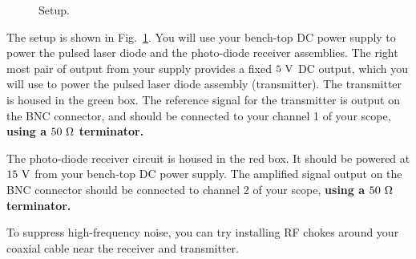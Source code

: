 \begin{figure}[htbp]
\begin{center}
\end{center}
\caption{\label{fig:csetup} Setup.}
\end{figure}

The setup is shown in Fig.~\ref{fig:csetup}.  You will use your
bench-top DC power supply to power the pulsed laser diode and the
photo-diode receiver assemblies.  The right most pair of output from
your supply provides a fixed $5~\rm V$ DC output, which you will use
to power the pulsed laser diode assembly (transmitter).  The
transmitter is housed in the green box. The reference signal for the
transmitter is output on the BNC connector, and should be connected to
your channel 1 of your scope, {\bf using a $50~\rm \Omega$ terminator.}

The photo-diode receiver circuit is housed in the red box.  It should
be powered at $15~\rm V$ from your bench-top DC power supply.  The
amplified signal output on the BNC connector should be connected to
channel 2 of your scope, {\bf using a $50~\rm \Omega$ terminator.}

To suppress high-frequency noise, you can try installing RF chokes
around your coaxial cable near the receiver and transmitter.  

